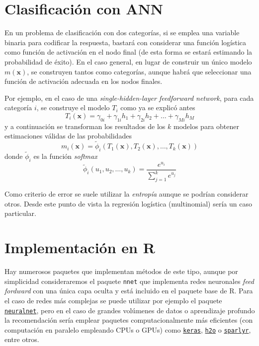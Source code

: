 \documentclass[
]{book}
\theoremstyle{break}
\theoremstyle{definition}
\theoremstyle{definition}
\theoremstyle{definition}
\theoremstyle{remark}
\begin{document}
\hypertarget{clasificaciuxf3n-con-ann}{%
\section{Clasificación con ANN}\label{clasificaciuxf3n-con-ann}}

En un problema de clasificación con dos categorías, si se emplea una variable binaria para codificar la respuesta, bastará con considerar una función logística como función de activación en el nodo final (de esta forma se estará estimando la probabilidad de éxito).
En el caso general, en lugar de construir un único modelo \(m(\mathbf{x})\), se construyen tantos como categorías, aunque habrá que seleccionar una función de activación adecuada en los nodos finales.

Por ejemplo, en el caso de una \emph{single-hidden-layer feedforward network}, para cada categoría \(i\), se construye el modelo \(T_i\) como ya se explicó antes
\[T_i(\mathbf{x}) = \gamma_{0i} + \gamma_{1i} h_1 + \gamma_{2i} h_2 + \ldots + \gamma_{Mi} h_M \]
y a continuación se transforman los resultados de los \(k\) modelos para obtener estimaciones válidas de las probabilidades
\[m_i(\mathbf{x}) = \tilde{\phi}_i (T_1(\mathbf{x}), T_2(\mathbf{x}),\ldots, T_k(\mathbf{x})) \]
donde \(\tilde{\phi}_i\) es la función \emph{softmax}
\[\tilde{\phi}_i (u_1,u_2,\ldots,u_k) = \frac{e^{u_i}}{\sum_{j=1}^k e^{u_j}}\]

Como criterio de error se suele utilizar la \emph{entropía} aunque se podrían considerar otros.
Desde este punto de vista la regresión logística (multinomial) sería un caso particular.

\hypertarget{implementaciuxf3n-en-r-2}{%
\section{Implementación en R}\label{implementaciuxf3n-en-r-2}}

Hay numerosos paquetes que implementan métodos de este tipo, aunque por simplicidad consideraremos el paquete \texttt{nnet} que implementa redes neuronales \emph{feed fordward} con una única capa oculta y está incluido en el paquete base de R.
Para el caso de redes más complejas se puede utilizar por ejemplo el paquete \href{https://CRAN.R-project.org/package=neuralnet}{\texttt{neuralnet}}, pero en el caso de grandes volúmenes de datos o aprendizaje profundo la recomendación sería emplear paquetes computacionalmente más eficientes (con computación en paralelo empleando CPUs o GPUs) como \href{https://keras.rstudio.com}{\texttt{keras}}, \href{https://github.com/h2oai/h2o-3}{\texttt{h2o}} o \href{https://spark.rstudio.com/}{\texttt{sparlyr}}, entre otros.
\end{document}
